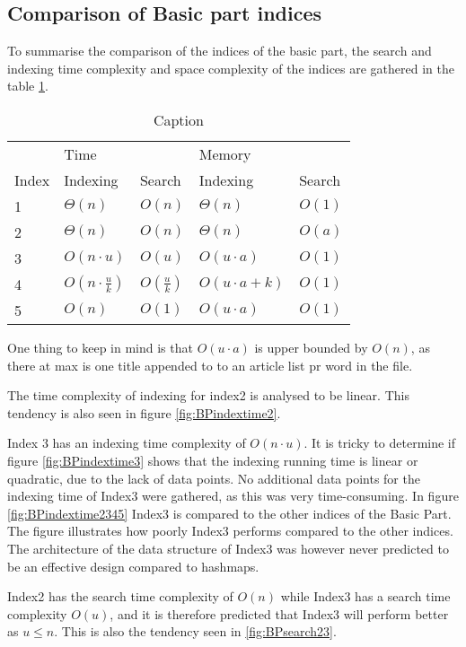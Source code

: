 \subsection{Comparison of Basic part indices}

To summarise the comparison of the indices of the basic part, the search and indexing time complexity and space complexity of the indices are gathered in the table \ref{tab:basicpartTimecomplexity}. 

\begin{table}[th!]
\centering
\begin{tabular}{l|ll|ll}
            & Time &     & Memory & \\
    Index & Indexing & Search & Indexing & Search\\
\hline
1 &  $\Theta(n)$                &  $O(n)$  &  $\Theta(n)$   & $O(1)$ \\
2 &  $\Theta(n)$                &  $O(n)$  &  $\Theta(n)$   & $O(a)$         \\
3  &  $O(n\cdot u)$             &  $O(u)$  &  $O(u\cdot a )$ & $O(1)$         \\
4  &  $O(n\cdot \frac{u}{k})$   &  $O(\frac{u}{k})$  &  $O(u\cdot a + k)$ & $O(1)$ \\
5  &  $O(n)$   &  $O(1)$  &  $O(u\cdot a)$ & $O(1)$         
\end{tabular}
\caption{Caption}
\label{tab:basicpartTimecomplexity}
\end{table}

One thing to keep in mind is that $O(u\cdot a)$ is upper bounded by $O(n)$, as there at max is one title appended to to an article list pr word in the file.

The time complexity of indexing for index2 is analysed to be linear. This tendency is also seen in figure \ref{fig:BPindextime2}.

Index 3 has an indexing time complexity of $O(n\cdot u)$. It is tricky to determine if figure \ref{fig:BPindextime3} shows that the indexing running time is linear or quadratic, due to the lack of data points. No additional data points for the indexing time of Index3 were gathered, as this was very time-consuming. In figure \ref{fig:BPindextime2345} Index3 is compared to the other indices of the Basic Part. The figure illustrates how poorly Index3 performs compared to the other indices. The architecture of the data structure of Index3 was however never predicted to be an effective design compared to hashmaps. 

Index2 has the search time complexity of $O(n)$ while Index3 has a search time complexity $O(u)$, and it is therefore predicted that Index3 will perform better as $u\leq n$. This is also the tendency seen in \ref{fig:BPsearch23}.

